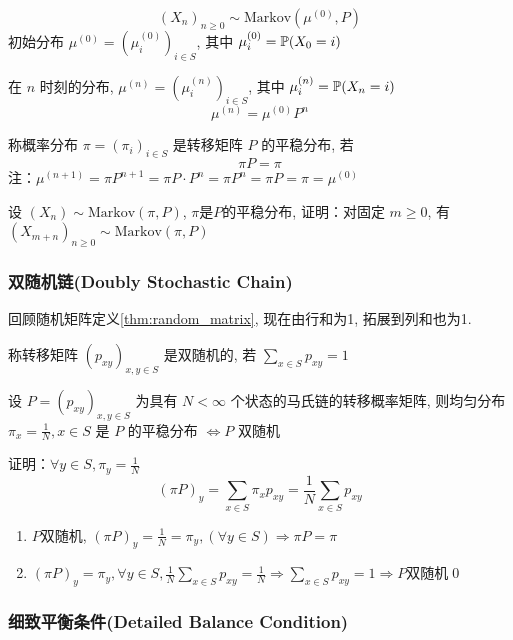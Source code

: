 \[
(X_n)_{n\geq 0}\sim \text{Markov}(\mu^{(0)},P)
\]
初始分布 $\mu^{(0)}=(\mu_i^{(0)})_{i\in S}$, 其中 $\mu_i^{(0)}=\mathbb{P}(X_0=i)$

在 $n$ 时刻的分布, $\mu^{(n)}=(\mu_i^{(n)})_{i\in S}$, 其中 $\mu_i^{(n)}=\mathbb{P}(X_n=i)$
\[
\mu^{(n)}=\mu^{(0)}P^n
\]
\begin{definition}[平稳分布]
    称概率分布 $\pi=(\pi_i)_{i\in S}$ 是转移矩阵 $P$ 的平稳分布, 若
    \begin{equation}
        \pi P=\pi
        \label{eq:stationary}
    \end{equation}
    注：$\mu^{(n+1)}=\pi P^{n+1}=\pi P\cdot P^n=\pi P^n=\pi P=\pi=\mu^{(0)}$
\end{definition}

\begin{problem}[作业6-4]
    设 $(X_n)\sim \text{Markov}(\pi,P)$, $\pi$是$P$的平稳分布, 证明：对固定 $m\geq 0$, 有 $(X_{m+n})_{n\geq 0}\sim \text{Markov}(\pi,P)$
\end{problem}

\subsubsection{双随机链(Doubly Stochastic Chain)}

回顾随机矩阵定义\ref{thm:random_matrix}, 现在由行和为1, 拓展到列和也为1.

\begin{definition}
    称转移矩阵 $(p_{xy})_{x,y\in S}$ 是双随机的, 若 $\sum_{x\in S}p_{xy}=1$
\end{definition}

\begin{theorem}
    设 $P=(p_{xy})_{x,y\in S}$ 为具有 $N<\infty$ 个状态的马氏链的转移概率矩阵, 则均匀分布 $\pi_x=\frac{1}{N},x\in S$ 是 $P$ 的平稳分布 $\Leftrightarrow P$ 双随机  
\end{theorem}

证明：$\forall y\in S,\pi_y=\frac{1}{N}$
\[
(\pi P)_y=\sum_{x\in S}\pi_x p_{xy}=\frac{1}{N}\sum_{x\in S}p_{xy}
\]
\begin{enumerate}
    \item $P$双随机, $(\pi P)_y=\frac{1}{N}=\pi_y,(\forall y\in S)\Rightarrow \pi P=\pi$
    \item $(\pi P)_y=\pi_y,\forall y\in S,\frac{1}{N}\sum_{x\in S}p_{xy}=\frac{1}{N}\Rightarrow \sum_{x\in S}p_{xy}=1\Rightarrow P$双随机\qed
\end{enumerate}

\subsubsection{细致平衡条件(Detailed Balance Condition)}

